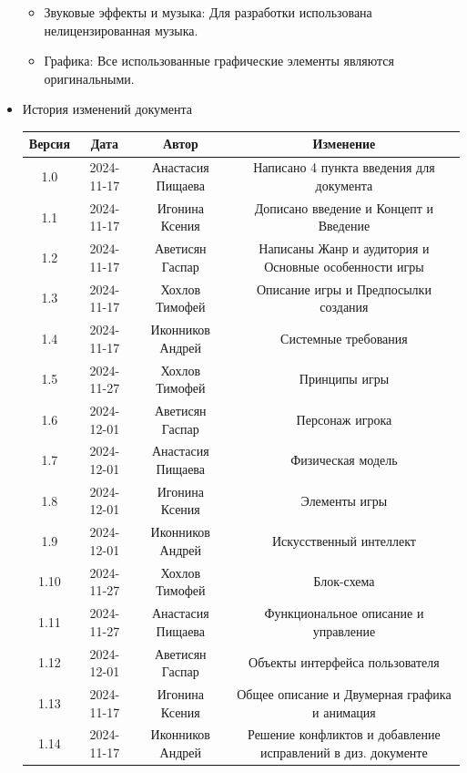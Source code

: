 \documentclass{article}
\begin{document}
\begin{itemize}
\begin{itemize}
\item Звуковые эффекты и музыка: Для разработки использована нелицензированная музыка.

\item Графика: Все использованные графические элементы являются оригинальными.
\end{itemize}

\item История изменений документа
\begin{center}
\begin{tabular}{| c | c | c | c |}
\hline
 Версия & Дата & Автор & Изменение \\  \hline
 1.0 & 2024-11-17 & Анастасия Пищаева & Написано 4 пункта введения для документа\\ \hline
 1.1 & 2024-11-17 & Игонина Ксения & Дописано введение и Концепт и Введение\\  \hline 
 1.2 & 2024-11-17 & Аветисян Гаспар & Написаны Жанр и аудитория и Основные особенности игры\\  \hline
 1.3 & 2024-11-17 & Хохлов Тимофей & Описание игры и Предпосылки создания\\  \hline
 1.4 & 2024-11-17 & Иконников Андрей & Системные требования\\ \hline 
 1.5 & 2024-11-27 & Хохлов Тимофей & Принципы игры\\  \hline
 1.6 & 2024-12-01 & Аветисян Гаспар & Персонаж игрока\\ \hline
 1.7 & 2024-12-01 & Анастасия Пищаева & Физическая модель\\ \hline
 1.8 & 2024-12-01 & Игонина Ксения & Элементы игры\\ \hline
 1.9 & 2024-12-01 & Иконников Андрей & Искусственный интеллект\\ \hline
 1.10 & 2024-11-27 & Хохлов Тимофей & Блок-схема\\  \hline
 1.11 & 2024-11-27 & Анастасия Пищаева & Функциональное описание и управление\\  \hline
 1.12 & 2024-12-01 & Аветисян Гаспар & Объекты интерфейса пользователя\\ \hline
 1.13 & 2024-11-17 & Игонина Ксения & Общее описание и Двумерная графика и анимация\\  \hline
 1.14 & 2024-11-17 & Иконников Андрей & Решение конфликтов и добавление исправлений в диз. документе\\  \hline


\end{tabular}
\end{center}


\end{itemize}
\end{document}
